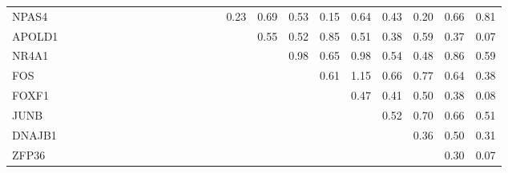 \begin{longtable}{lrrrrrrrrrrrrrrrrrrrrrrr}
NPAS4  &             &            &            &             &              &            &             &              &              &           &             &            &             &             &         0.23 &        0.69 &      0.53 &        0.15 &       0.64 &         0.43 &        0.20 &       0.66 &       0.81 \\
APOLD1 &             &            &            &             &              &            &             &              &              &           &             &            &             &             &              &        0.55 &      0.52 &        0.85 &       0.51 &         0.38 &        0.59 &       0.37 &       0.07 \\
NR4A1  &             &            &            &             &              &            &             &              &              &           &             &            &             &             &              &             &      0.98 &        0.65 &       0.98 &         0.54 &        0.48 &       0.86 &       0.59 \\
FOS    &             &            &            &             &              &            &             &              &              &           &             &            &             &             &              &             &           &        0.61 &       1.15 &         0.66 &        0.77 &       0.64 &       0.38 \\
FOXF1  &             &            &            &             &              &            &             &              &              &           &             &            &             &             &              &             &           &             &       0.47 &         0.41 &        0.50 &       0.38 &       0.08 \\
JUNB   &             &            &            &             &              &            &             &              &              &           &             &            &             &             &              &             &           &             &            &         0.52 &        0.70 &       0.66 &       0.51 \\
DNAJB1 &             &            &            &             &              &            &             &              &              &           &             &            &             &             &              &             &           &             &            &              &        0.36 &       0.50 &       0.31 \\
ZFP36  &             &            &            &             &              &            &             &              &              &           &             &            &             &             &              &             &           &             &            &              &             &       0.30 &       0.07 \\

\end{longtable}
